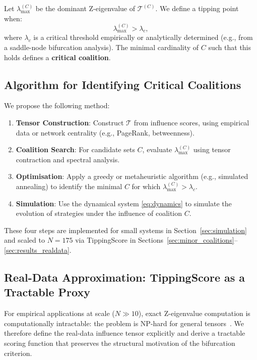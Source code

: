 \documentclass[11pt]{article}
\begin{document}
Let $\lambda_{\max}^{(C)}$ be the dominant Z-eigenvalue of $\mathcal{T}^{(C)}$. We define a tipping point when:
\[
\lambda_{\max}^{(C)} > \lambda_c,
\]
where $\lambda_c$ is a critical threshold empirically or analytically determined (e.g., from a saddle-node bifurcation analysis). The minimal cardinality of $C$ such that this holds defines a \textbf{critical coalition}.

\subsection{Algorithm for Identifying Critical Coalitions}

We propose the following method:

\begin{enumerate}
	\item \textbf{Tensor Construction}: Construct $\mathcal{T}$ from influence scores, using empirical data or network centrality (e.g., PageRank, betweenness).
	\item \textbf{Coalition Search}: For candidate sets $C$, evaluate $\lambda_{\max}^{(C)}$ using tensor contraction and spectral analysis.
	\item \textbf{Optimisation}: Apply a greedy or metaheuristic algorithm (e.g., simulated annealing) to identify the minimal $C$ for which $\lambda_{\max}^{(C)} > \lambda_c$.
	\item \textbf{Simulation}: Use the dynamical system \eqref{eq:dynamics} to simulate the evolution of strategies under the influence of coalition $C$.
\end{enumerate}

These four steps are implemented for small systems in Section~\ref{sec:simulation} and scaled to $N=175$ via TippingScore in Sections~\ref{sec:minor_coalitions}--\ref{sec:results_realdata}.

\subsection{Real-Data Approximation: TippingScore as a Tractable Proxy}
\label{sec:tipping_score_proxy}

For empirical applications at scale ($N \gg 10$), exact Z-eigenvalue computation is computationally intractable: the problem is NP-hard for general tensors~\citep{hillar2013most}. We therefore define the real-data influence tensor explicitly and derive a tractable scoring function that preserves the structural motivation of the bifurcation criterion.
\end{document}
